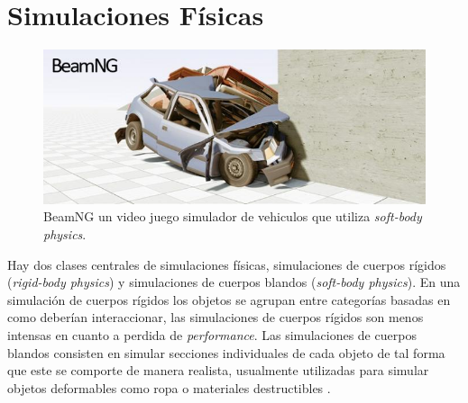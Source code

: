 \section{Simulaciones Físicas}
\setlength\intextsep{0pt}
\begin{figure}
\includegraphics[width=\linewidth]{semana13/beamng_gamephysics.jpg}
\caption{BeamNG un video juego simulador de vehiculos que utiliza \emph{soft-body physics}.}
\label{fig:beamng}
\end{figure}
Hay dos clases centrales de simulaciones físicas, simulaciones de cuerpos rígidos (\emph{rigid-body physics}) y simulaciones de cuerpos blandos (\emph{soft-body physics}). En una simulación de cuerpos rígidos los objetos se agrupan entre categorías basadas en como deberían interaccionar, las simulaciones de cuerpos rígidos son menos intensas en cuanto a perdida de \emph{performance}. Las simulaciones de cuerpos blandos consisten en simular secciones individuales de cada objeto de tal forma que este se comporte de manera realista, usualmente utilizadas para simular objetos deformables como ropa o materiales destructibles \cite{ian_gamephysics}.
